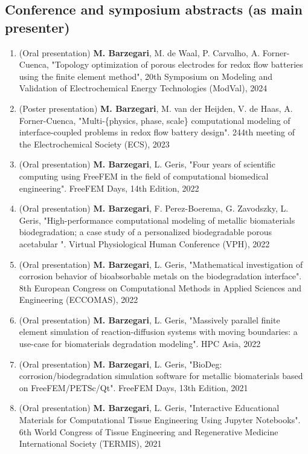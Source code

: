 \documentclass{cv}
\begin{document}
\subsection{Conference and symposium abstracts (as main presenter)}

\begin{enumerate}[itemsep=-0.2ex]
\item
(Oral presentation) 
\textbf{M. Barzegari}, M. de Waal, P. Carvalho, A. Forner-Cuenca, "Topology optimization of porous electrodes for redox flow batteries using the finite element method", 20th Symposium on Modeling and Validation of Electrochemical Energy Technologies (ModVal), 2024
\item
(Poster presentation) 
\textbf{M. Barzegari}, M. van der Heijden, V. de Haas, A. Forner-Cuenca,
"Multi-\{physics, phase, scale\} computational modeling of interface-coupled problems in redox flow battery design". 244th meeting of the Electrochemical Society (ECS), 2023
\item
(Oral presentation) 
\textbf{M. Barzegari}, L. Geris, "Four years of scientific computing using FreeFEM in the field of computational biomedical engineering". FreeFEM Days, 14th Edition, 2022
\item
(Oral presentation) 
\textbf{M. Barzegari}, F. Perez-Boerema, G. Zavodszky, L. Geris, "High-performance computational modeling of metallic biomaterials biodegradation; a case study of a personalized biodegradable porous acetabular ". Virtual Physiological Human Conference (VPH), 2022
\item
(Oral presentation) 
\textbf{M. Barzegari}, L. Geris, "Mathematical investigation of corrosion behavior of bioabsorbable metals on the biodegradation interface". 8th European Congress on Computational Methods in Applied Sciences and Engineering (ECCOMAS), 2022
\item
(Oral presentation) 
\textbf{M. Barzegari}, L. Geris, "Massively parallel finite element simulation of reaction-diffusion systems with moving boundaries: a use-case for biomaterials degradation modeling". HPC Asia, 2022
\item
(Oral presentation) 
\textbf{M. Barzegari}, L. Geris, "BioDeg: corrosion/biodegradation simulation software for metallic biomaterials based on FreeFEM/PETSc/Qt". FreeFEM Days, 13th Edition, 2021
\item
(Oral presentation) 
\textbf{M. Barzegari}, L. Geris, "Interactive Educational Materials for Computational Tissue Engineering Using Jupyter Notebooks". 6th World Congress of Tissue Engineering and Regenerative Medicine International Society (TERMIS), 2021

\end{enumerate}
\end{document}

